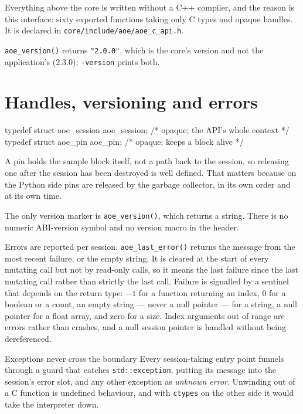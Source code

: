 \documentclass[11pt,a4paper,oneside]{report}
\newcommand{\appver}{2.3.0}
\newcommand{\code}[1]{\texttt{#1}}
\begin{document}
Everything above the core is written without a C++ compiler, and the reason is
this interface: sixty exported functions taking only C types and opaque handles.
It is declared in \code{core/include/aoe/aoe\_c\_api.h}.

\code{aoe\_version()} returns \code{"2.0.0"}, which is the core's version and
not the application's (\appver); \code{-version} prints both.

\section{Handles, versioning and errors}

\begin{aoecode}
typedef struct aoe_session aoe_session;   /* opaque; the API's whole context */
typedef struct aoe_pin     aoe_pin;       /* opaque; keeps a block alive */
\end{aoecode}

A pin holds the sample block itself, not a path back to the session, so
releasing one after the session has been destroyed is well defined. That matters
because on the Python side pins are released by the garbage collector, in its
own order and at its own time.

The only version marker is \code{aoe\_version()}, which returns a string. There
is no numeric ABI-version symbol and no version macro in the header.

Errors are reported per session. \code{aoe\_last\_error()} returns the message
from the most recent failure, or the empty string. It is cleared at the start of
every mutating call but not by read-only calls, so it means the last failure
since the last mutating call rather than strictly the last call. Failure is
signalled by a sentinel that depends on the return type: $-1$ for a function
returning an index, 0 for a boolean or a count, an empty string --- never a null
pointer --- for a string, a null pointer for a float array, and zero for a size.
Index arguments out of range are errors rather than crashes, and a null session
pointer is handled without being dereferenced.

\begin{aoenote}{Exceptions never cross the boundary}
Every session-taking entry point funnels through a guard that catches
\code{std::exception}, putting its message into the session's error slot, and
any other exception as \emph{unknown error}. Unwinding out of a C function is
undefined behaviour, and with \code{ctypes} on the other side it would take the
interpreter down.
\end{aoenote}
\end{document}
